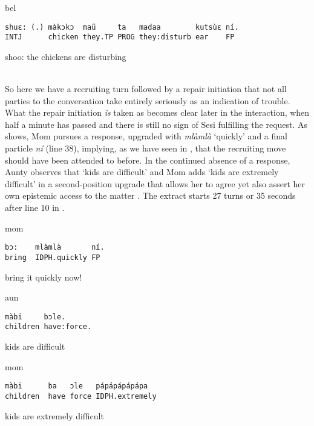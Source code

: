 \documentclass[output=paper]{langsci/langscibook}
\begin{document}
%
\begin{transbox}{10}{bel}
\begin{verbatim}
shuɛ: (.) màkɔkɔ  maũ     ta   madaa        kutsùɛ ní.
INTJ      chicken they.TP PROG they:disturb ear    FP
\end{verbatim}
shoo: the chickens are disturbing
\end{transbox}
%
\\

\normalsize
So here we have a recruiting turn followed by a repair initiation that not all parties to the conversation take entirely seriously as an indication of trouble. What the repair initiation \textit{is} taken as becomes clear later in the interaction, when half a minute has passed and there is still no sign of Sesi fulfilling the request. As  shows, Mom pursues a response, upgraded with \textit{mlàmlà} ‘quickly’ and a final particle \textit{ní} (line 38), implying, as we have seen in , that the recruiting move should have been attended to before. In the continued absence of a response, Aunty observes that ‘kids are difficult’ and Mom adds ‘kids are extremely difficult’ in a second-position upgrade that allows her to agree yet also assert her own epistemic access to the matter \citep{heritage_terms_2005}. The extract starts 27 turns or 35 seconds after line 10 in .

\vspace{2mm}
%
%
\begin{mdframednoverticalspace}[style=firstfoc]
%
\begin{transbox}{38}{mom}
\begin{verbatim}
bɔ:    mlàmlà       ní.
bring  IDPH.quickly FP
\end{verbatim}
bring it quickly now!
\end{transbox}
\end{mdframednoverticalspace}
%
%
\begin{transbox}{40}{aun}
\begin{verbatim}
màbi     bɔle.
children have:force.
\end{verbatim}
kids are difficult
\end{transbox}
%
\begin{transbox}{41}{mom}
\begin{verbatim}
màbi      ba   ɔle   pápápápápápa
children  have force IDPH.extremely
\end{verbatim}
kids are extremely difficult
\end{transbox}\bigskip
\end{document}
